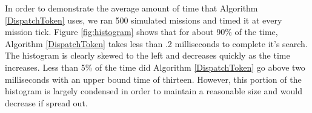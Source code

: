 In order to demonstrate the average amount of time that Algorithm \ref{DispatchToken} uses, we ran 500 simulated missions
and timed it at every mission tick. Figure \ref{fig:histogram} shows that for about 90\% of the time, Algorithm \ref{DispatchToken}
takes less than .2 milliseconds to complete it's search. The histogram is clearly skewed to the left and decreases quickly as the
time increases. Less than 5\% of the time did Algorithm \ref{DispatchToken} go above
two milliseconds with an upper bound time of thirteen. However, this portion of the histogram is largely condensed in 
order to maintain a reasonable size and would decrease if spread out.   





